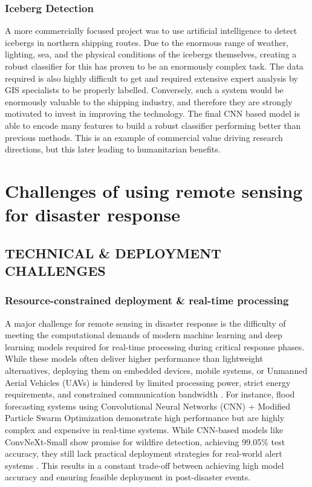 \documentclass[conference,a4paper]{IEEEtran}
\begin{document}
\subsubsection{Iceberg Detection}

A more commercially focused project was to use artificial intelligence to detect icebergs in northern shipping routes.  Due to the enormous range of weather, lighting, sea,  and the physical conditions of the icebergs themselves, creating a robust classifier for this has proven to be an enormously complex task. The data required is also highly difficult to get and required extensive expert analysis by GIS specialists to be properly labelled. Conversely, such a system would be enormously valuable to the shipping industry, and therefore they are strongly motivated to invest in improving the technology. The final CNN based model is able to encode many features to build a robust classifier performing better than previous methods. This is an example of commercial value driving research directions, but this later leading to humanitarian benefits.


\section{Challenges of using remote sensing for disaster response}


\subsection{TECHNICAL \& DEPLOYMENT CHALLENGES}

\subsubsection{\textbf{Resource-constrained deployment \& real-time processing}}
A major challenge for remote sensing in disaster response is the difficulty of meeting the computational demands of modern machine learning and deep learning models required for real-time processing during critical response phases. While these models often deliver higher performance than lightweight alternatives, deploying them on embedded devices, mobile systems, or Unmanned Aerial Vehicles (UAVs) is hindered by limited processing power, strict energy requirements, and constrained communication bandwidth \cite{elbohy2025fusion}. For instance, flood forecasting systems using Convolutional Neural Networks (CNN) + Modified Particle Swarm Optimization demonstrate high performance but are highly complex and expensive in real-time systems. While CNN-based models like ConvNeXt-Small show promise for wildfire detection, achieving 99.05\% test accuracy, they still lack practical deployment strategies for real-world alert systems \cite{elbohy2025fusion}. This results in a constant trade-off between achieving high model accuracy and ensuring feasible deployment in post-disaster events.
\end{document}

